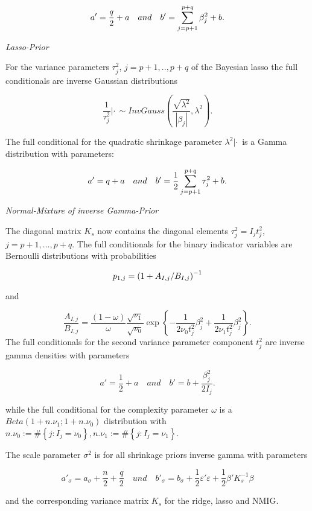 \documentclass[11pt,a4paper,twoside]{bayesxarticle}
\begin{document}
\[a'=\frac{q}{2} +a\quad {\rm and}\quad b'=\sum _{j=p+1}^{p+q}\beta _{j}^{2}  +b.\]


{\em Lasso-Prior}

For the variance parameters $\tau _{j}^{2} $, $j=p+1,..,p+q$ of the Bayesian lasso the full conditionals are inverse Gaussian
distributions

\[\frac{1}{\tau _{j}^{2} } |\cdot \, \sim InvGauss\left(\frac{\sqrt{\lambda ^{2}
} }{\left|\beta _{j} \right|} ,\lambda ^{2} \right).\]

The full conditional for the quadratic shrinkage parameter $\lambda ^{2} |\cdot \, $ is
a Gamma distribution with parameters:

\[a'=q+a\quad {\rm and}\quad b'=\frac{1}{2} \sum _{j=p+1}^{p+q}\tau _{j}^{2}  +b.\]

{\em Normal-Mixture of inverse Gamma-Prior}

The diagonal matrix $K_{s} $ now contains the diagonal elements $\tau _{j}^{2} =I_{j} t_{j}^{2} $, $j=p+1,\ldots,p+q$. The full
conditionals for the binary indicator variables are Bernoulli distributions with probabilities

\[p_{1,j} =\left({1+A_{I,j} \mathord{\left/ {\vphantom {1+A_{I,j}  B_{I,j} }} \right.
\kern-\nulldelimiterspace} B_{I,j} } \right)^{-1} \]

and

\[\frac{A_{I,j} }{B_{I,j} } =\frac{\left(1-\omega \right)}{\omega } \frac{\sqrt{
\nu _{1} } }{\sqrt{\nu _{0} } } \exp \left\{-\frac{1}{2\nu _{0} t_{j}^{2} } \beta
_{j}^{2} +\frac{1}{2\nu _{1} t_{j}^{2} } \beta _{j}^{2} \right\}.\]
The full conditionals for the second variance parameter component $t_{j}^{2} $ are
inverse gamma densities with parameters

\[a'=\frac{1}{2} +a\quad and\quad b'=b+\frac{\beta _{j}^{2} }{2I_{j} } .\]

while the full conditional for the complexity parameter $\omega $ is a $Beta\left(1+n.
\nu _{1} ;1+n.\nu _{0} \right)$ distribution with $n.\nu _{0} :=\# \left\{j:I_{j}
=\nu _{0} \right\},n.\nu _{1} :=\# \left\{j:I_{j} =\nu _{1} \right\}$.

The scale parameter $\sigma ^{2} $ is for all shrinkage priors inverse
gamma with parameters

\[a'_{\sigma } =a_{\sigma } +\frac{n}{2} +\frac{q}{2} \quad und\quad b'_{\sigma }
=b_{\sigma } +\frac{1}{2} \varepsilon '\varepsilon +\frac{1}{2} \beta 'K_{s}^{-1}
\beta \]

and the corresponding variance matrix $K_{s} $ for the ridge, lasso and NMIG.
\end{document}
